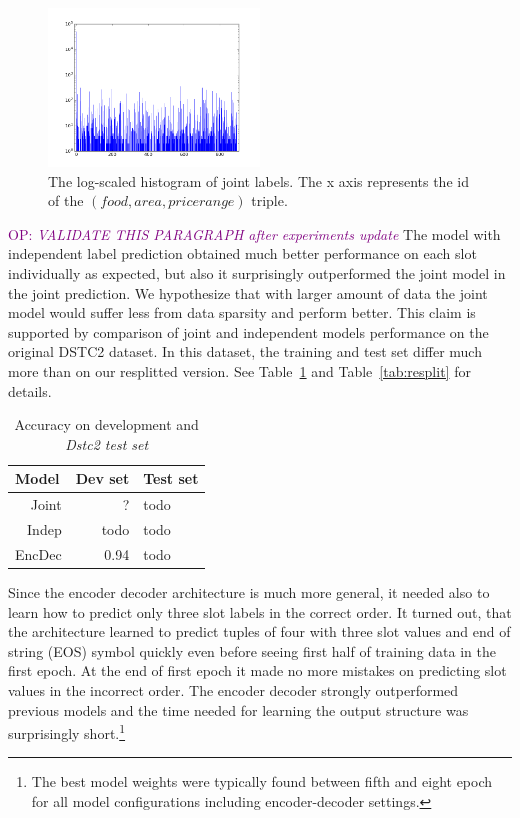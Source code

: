 \documentclass{itatnew}
\def\OP#1{\textcolor{purple}{OP: \textit{#1}}}
\begin{document}
\begin{figure}
\includegraphics[width=0.5\textwidth]{dstc2_goals_joint_log_scale}
\caption{The log-scaled histogram of joint labels. The x axis represents the id of the $(food, area, pricerange)$ triple.}
\label{fig:labels}
\end{figure}

\OP{VALIDATE THIS PARAGRAPH after experiments update}
The model with independent label prediction obtained much better performance on each slot individually as expected, but also it surprisingly outperformed the joint model in the joint prediction.
We hypothesize that with larger amount of data the joint model would suffer less from data sparsity and perform better.
This claim is supported by comparison of joint and independent models performance on the original DSTC2 dataset.
In this dataset, the training and test set differ much more than on our resplitted version. 
See Table~\ref{tab:dstc} and Table~\ref{tab:resplit} for details.

\begin{table}
\caption{Accuracy on development and {\it Dstc2 test set }}
\begin{center}
\begin{tabular}{r@{\quad}rll}
\hline
\multicolumn{1}{l}{\rule{0pt}{12pt}
                   Model}&\multicolumn{1}{l}{Dev set}&\multicolumn{2}{l}{Test set}\\[2pt]
\hline\rule{0pt}{12pt}
Joint  &     ?&  todo \\
Indep  &   todo& todo \\
EncDec &   0.94 & todo \\
\hline
\end{tabular}
\end{center}
\label{tab:dstc}
\end{table}

Since the encoder decoder architecture is much more general, it needed also to learn how to predict only three slot labels in the correct order.
It turned out, that the architecture learned to predict tuples of four with three slot values and end of string (EOS) symbol quickly even before seeing first half of training data in the first epoch.
At the end of first epoch it made no more mistakes on predicting slot values in the incorrect order.
The encoder decoder strongly outperformed previous models and the time needed for learning the output structure was surprisingly short.\footnote{The best model weights were typically found between fifth and eight epoch for all model configurations including encoder-decoder settings.}
\end{document}
